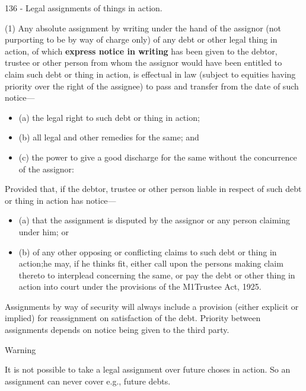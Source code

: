 \documentclass[
]{article}
\providecommand{\tightlist}{%
  \setlength{\itemsep}{0pt}\setlength{\parskip}{0pt}}
\newenvironment{env-99ba4262-5297-4318-9547-86307715f49a}
{
    \savenotes\tcolorbox[blanker,breakable,left=5pt,borderline west={2pt}{-4pt}{green}]
}
{
    \endtcolorbox\spewnotes
}
\newenvironment{env-31409176-8a91-46bb-85fd-48f2d6a04234}
{
    \savenotes\tcolorbox[blanker,breakable,left=5pt,borderline west={2pt}{-4pt}{orange}]
}
{
    \endtcolorbox\spewnotes
}
\begin{document}
\begin{env-99ba4262-5297-4318-9547-86307715f49a}

136 - Legal assignments of things in action.

(1) Any absolute assignment by writing under the hand of the assignor
(not purporting to be by way of charge only) of any debt or other legal
thing in action, of which \textbf{express notice in writing} has been
given to the debtor, trustee or other person from whom the assignor
would have been entitled to claim such debt or thing in action, is
effectual in law (subject to equities having priority over the right of
the assignee) to pass and transfer from the date of such notice---

\begin{itemize}
\tightlist
\item
  (a) the legal right to such debt or thing in action;
\item
  (b) all legal and other remedies for the same; and
\item
  (c) the power to give a good discharge for the same without the
  concurrence of the assignor:
\end{itemize}

Provided that, if the debtor, trustee or other person liable in respect
of such debt or thing in action has notice---

\begin{itemize}
\tightlist
\item
  (a) that the assignment is disputed by the assignor or any person
  claiming under him; or
\item
  (b) of any other opposing or conflicting claims to such debt or thing
  in action;he may, if he thinks fit, either call upon the persons
  making claim thereto to interplead concerning the same, or pay the
  debt or other thing in action into court under the provisions of the
  M1Trustee Act, 1925.
\end{itemize}

\end{env-99ba4262-5297-4318-9547-86307715f49a}

Assignments by way of security will always include a provision (either
explicit or implied) for reassignment on satisfaction of the debt.
Priority between assignments depends on notice being given to the third
party.

\begin{env-31409176-8a91-46bb-85fd-48f2d6a04234}

Warning

It is not possible to take a legal assignment over future choses in
action. So an assignment can never cover e.g., future debts.

\end{env-31409176-8a91-46bb-85fd-48f2d6a04234}
\end{document}

